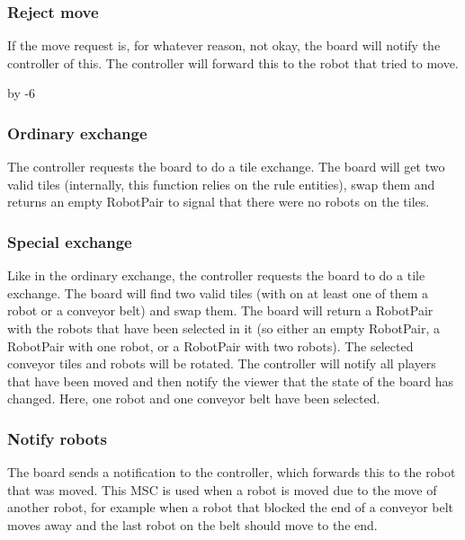 	


	\subsubsection{Reject move}
	If the move request is, for whatever reason, not okay, the board will notify the controller of this. The controller will forward this to the robot that tried to move.

	


	\advance{} by -6

	\subsubsection{Ordinary exchange}
	The controller requests the board to do a tile exchange. The board will get two valid tiles (internally, this function relies on the rule entities), swap them and returns an empty RobotPair to signal that there were no robots on the tiles.

	

	\subsubsection{Special exchange}
	Like in the ordinary exchange, the controller requests the board to do a tile exchange. The board will find two valid tiles (with on at least one of them a robot or a conveyor belt) and swap them. The board will return a RobotPair with the robots that have been selected in it (so either an empty RobotPair, a RobotPair with one robot, or a RobotPair with two robots). The selected conveyor tiles and robots will be rotated. The controller will notify all players that have been moved and then notify the viewer that the state of the board has changed. Here, one robot and one conveyor belt have been selected.

	
	
	\subsubsection{Notify robots}
	The board sends a notification to the controller, which forwards this to the robot that was moved. This MSC is used when a robot is moved due to the move of another robot, for example when a robot that blocked the end of a conveyor belt moves away and the last robot on the belt should move to the end.

